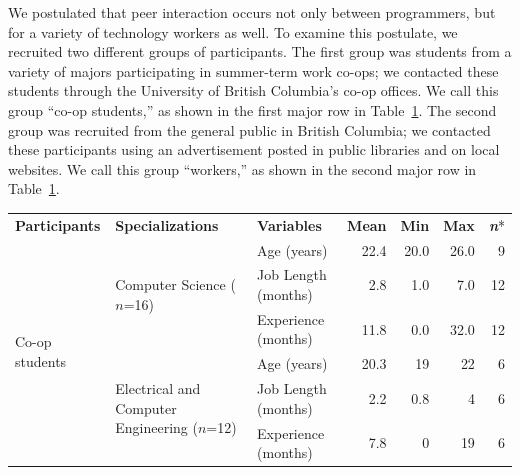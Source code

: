 \documentclass[smallextended]{svjour3}
\newcommand\discovery{peer interaction\xspace}
\begin{document}
\noindent
We postulated that \discovery occurs not only between programmers,
but for a variety of technology workers as well.
To examine this postulate, we recruited two different groups of participants.
The first group was students from a variety of majors participating 
in summer-term work co-ops; we contacted
these students through the University of British Columbia's co-op offices.
We call this group ``co-op students,'' as shown in the first major row in
Table~\ref{tbl:demographics}.
The second group was recruited from the general public in British Columbia;
we contacted these participants using an advertisement posted in public libraries 
and on local websites.
We call this group ``workers,'' as shown in the second major row in
Table~\ref{tbl:demographics}.

\begin{center}
\begin{table}[t]

\renewcommand{\arraystretch}{1.4} 

   \centering

	\label{tbl:demographics}
	
   \begin{tabularx}{\linewidth}{p{17mm}p{27mm}Xrrrr}
   		\textbf{Participants}&\textbf{Specializations}&\textbf{Variables} &\textbf{Mean}&\textbf{Min}&\textbf{Max}&\textbf{\textit{n}}*\\	
		\cline{1-7} 
		\multirow{9}{15mm}{Co-op students} & \multirow{3}{25mm}{Computer Science ($n$=16) } & Age (years) & 22.4  & 20.0  & 26.0  & 9 \\
          & & Job Length (months) & 2.8   & 1.0   & 7.0   & 12 \\
          & & Experience (months) & 11.8  & 0.0   & 32.0  & 12 \\
					\cline{2-7}
					
          & \multirow{3}{25mm}{Electrical and Computer Engineering ($n$=12)} & Age (years) & 20.3  & 19  & 22  & 6 \\
          &  & Job Length (months) & 2.2   & 0.8   & 4   & 6 \\
          &  & Experience (months) & 7.8  & 0   & 19  & 6 \\
					\cline{2-7}
					

\end{tabularx}
\end{table}
\end{center}
\end{document}
